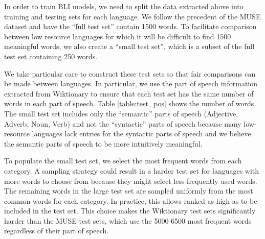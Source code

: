 \documentclass[11pt]{article}
\begin{document}
In order to train BLI models, we need to split the data extracted above into training and testing sets for each language.
We follow the precedent of the MUSE dataset and have the ``full test set'' contain 1500 words.
To facilitate comparison between low resource languages for which it will be difficult to find 1500 meaningful words,
we also create a ``small test set'', which is a subset of the full test set containing 250 words.

We take particular care to construct these test sets so that fair comparisons can be made between languages.
In particular, we use the part of speech information extracted from Wiktionary to ensure that each test set has the same number of words in each part of speech.
Table \ref{table:test_pos} shows the number of words.
The small test set includes only the ``semantic'' parts of speech (Adjective, Adverb, Noun, Verb) and not the ``syntactic'' parts of speech because many low-resource languages lack entries for the syntactic parts of speech and we believe the semantic parts of speech to be more intuitively meaningful.

To populate the small test set, we select the most frequent words from each category.
A sampling strategy could result in a harder test set for languages with more words to choose from because they might select less-frequently used words.
The remaining words in the large test set are sampled uniformly from the  most common words for each category.
In practice, this allows ranked as high as  to be included in the test set.
This choice makes the Wiktionary test sets significantly harder than the MUSE test sets, which use the 5000-6500 most frequent words regardless of their part of speech.

\end{document}
